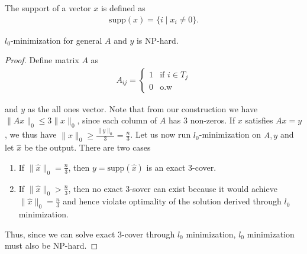\begin{definition}
The support of a vector $x$ is defined as
\begin{align*}
\text{supp}(x) = \{i \mid x_i \neq 0 \}.
\end{align*}
\end{definition}

\begin{theorem}
$l_0$-minimization for general $A$ and $y$ is NP-hard.
\end{theorem}
\begin{proof}
Define matrix $A$ as
\begin{align*}
    A_{ij} = \begin{cases}
    1 & \text{if } i \in T_j \\
    0 & \text{o.w}
    \end{cases}
\end{align*}

and $y$ as the all ones vector. Note that from our construction we have $\|Ax\|_0 \leq 3\|x\|_0$, since each column of $A$ has 3 non-zeros. If $x$ satisfies $Ax = y$, we thus have $\|x\|_0 \geq \frac{\|y\|_0}{3} = \frac{n}{3}$. Let us now run $l_0$-minimization on $A, y$ and let $\hat{x}$ be the output. There are two cases

\begin{enumerate}
    \item If $\|\hat{x}\|_0 = \frac{n}{3}$, then $y = \text{supp}(\hat{x})$ is an exact 3-cover. %
    \item If $\| \hat{x}\|_0 > \frac{n}{3}$, then no exact 3-sover can exist because it would achieve $\|\hat{x}\|_0 = \frac{n}{3}$ and hence violate optimality of the solution derived through $l_0$ minimization.
\end{enumerate}

Thus, since we can solve exact 3-cover through $l_0$ minimization, $l_0$ minimization must also be NP-hard.
\end{proof}

